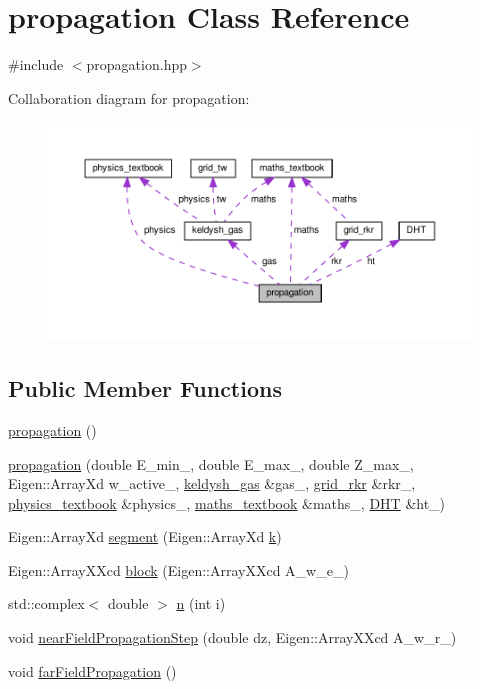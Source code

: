 \hypertarget{classpropagation}{}\section{propagation Class Reference}
\label{classpropagation}


{\ttfamily \#include $<$propagation.\+hpp$>$}



Collaboration diagram for propagation\+:\nopagebreak
\begin{figure}[H]
\begin{center}
\leavevmode
\includegraphics[width=350pt]{classpropagation__coll__graph}
\end{center}
\end{figure}
\subsection*{Public Member Functions}
\begin{DoxyCompactItemize}
\item 
\hyperlink{classpropagation_a9d7b9f42ce1c0bc741d3016a07ba13f7}{propagation} ()
\item 
\hyperlink{classpropagation_a082efa11767639ade0eaf0f8856cc410}{propagation} (double E\+\_\+min\+\_\+, double E\+\_\+max\+\_\+, double Z\+\_\+max\+\_\+, Eigen\+::\+Array\+Xd w\+\_\+active\+\_\+, \hyperlink{classkeldysh__gas}{keldysh\+\_\+gas} \&gas\+\_\+, \hyperlink{classgrid__rkr}{grid\+\_\+rkr} \&rkr\+\_\+, \hyperlink{classphysics__textbook}{physics\+\_\+textbook} \&physics\+\_\+, \hyperlink{classmaths__textbook}{maths\+\_\+textbook} \&maths\+\_\+, \hyperlink{class_d_h_t}{D\+HT} \&ht\+\_\+)
\item 
Eigen\+::\+Array\+Xd \hyperlink{classpropagation_a39126bbbd4977c140c0077b849e78bc1}{segment} (Eigen\+::\+Array\+Xd \hyperlink{classpropagation_a49a30e941421cd5e3f0b62bd1335a767}{k})
\item 
Eigen\+::\+Array\+X\+Xcd \hyperlink{classpropagation_af12b15d9b91f98516c0ff25efc1233d1}{block} (Eigen\+::\+Array\+X\+Xcd A\+\_\+w\+\_\+e\+\_\+)
\item 
std\+::complex$<$ double $>$ \hyperlink{classpropagation_a7c696d9e54e5f0a7735047e28aee4866}{n} (int i)
\item 
void \hyperlink{classpropagation_a65e272beb6b5b73f433456361bcde914}{near\+Field\+Propagation\+Step} (double dz, Eigen\+::\+Array\+X\+Xcd A\+\_\+w\+\_\+r\+\_\+)
\item 
void \hyperlink{classpropagation_a9c2e1cb4e314c173b26de08ffcfe071d}{far\+Field\+Propagation} ()
\end{DoxyCompactItemize}
